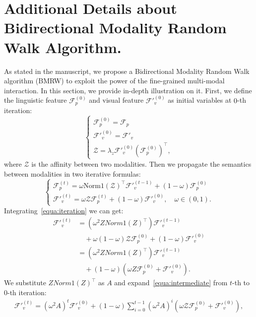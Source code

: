 \documentclass[10pt,twocolumn,letterpaper]{article}
\begin{document}
\section{Additional Details about Bidirectional Modality Random Walk Algorithm.}
As stated in the manuscript, we propose a Bidirectional Modality Random Walk algorithm (BMRW) to exploit the power of the fine-grained multi-modal interaction. In this section, we provide in-depth illustration on it. First, we define the linguistic feature $\mathcal{F}_p^{(0)}$ and visual feature $\mathcal{F'}_v^{(0)}$ as initial variables at $0$-th iteration:
\begin{equation}
    \left\{\begin{matrix}
\mathcal{F}_p^{(0)}=\mathcal{F}_p
 \\
\mathcal{F'}_v^{(0)}=\mathcal{F'}_v
 \\
\mathcal{Z}=\lambda_{z}\mathcal{F'}_v^{(0)} (\mathcal{F}_p^{(0)})^{\top },
\end{matrix}\right.
\end{equation}
where $\mathcal{Z}$ is the affinity between two modalities.
Then we propagate the semantics between modalities in two iterative formulas:
\begin{equation}
    \left\{\begin{matrix}
\mathcal{F}_p^{(t)}=\omega \mathrm{Norm1}(\mathcal{Z})^{\top }\mathcal{F'}_v^{(t-1)}+(1-\omega )\mathcal{F}_p^{(0)}
 \\
\mathcal{F'}_v^{(t)}=\omega \mathcal{Z}\mathcal{F}_p^{(t)} + (1-\omega )\mathcal{F'}_v^{(0)}, \quad \omega \in (0,1).
\end{matrix}\right.
\label{equa:iteration}
\end{equation}
Integrating~\cref{equa:iteration} we can get:
\begin{equation}
\begin{aligned}
    \mathcal{F'}_v^{(t)} &= (\omega^2 ZNorm1(Z)^\top) \mathcal{F'}_v^{(t-1)} \\& \quad+ \omega(1-\omega) \mathcal{Z}\mathcal{F}_p^{(0)} + (1-\omega)\mathcal{F'}_v^{(0)} 
\\ &= (\omega^2 ZNorm1(Z)^\top) \mathcal{F'}_v^{(t-1)} \\& \quad+(1-\omega)(\omega Z \mathcal{F}_p^{(0)} + \mathcal{F'}_v^{(0)}).
\end{aligned}
\label{equa:intermediate}
\end{equation}
We substitute $ZNorm1(Z)^\top$ as $A$ and expand~\cref{equa:intermediate} from $t$-th to $0$-th iteration:
\begin{equation}
\begin{split}
    \mathcal{F'}_v^{(t)} = (\omega^2A)^{t} \mathcal{F'}_v^{(0)} + (1-\omega )\sum_{i=0}^{t-1} (\omega^2A)^{i}(\omega \mathcal{Z}\mathcal{F}_p^{(0)}+\mathcal{F'}_v^{(0)}),
\end{split}
\label{equa:result}
\end{equation}
\end{document}
